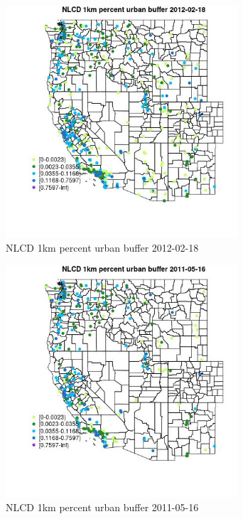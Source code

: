 \begin{figure} 
\centering  
\includegraphics[width=0.77\textwidth]{Code_Outputs/Report_ML_input_PM25_Step4_part_f_de_duplicated_aveswNAs_MapObsNLCD_1km_percent_urban_buffer2012-02-18.jpg} 
\caption{\label{fig:Report_ML_input_PM25_Step4_part_f_de_duplicated_aveswNAsMapObsNLCD_1km_percent_urban_buffer2012-02-18}NLCD 1km percent urban buffer 2012-02-18} 
\end{figure} 
 

\begin{figure} 
\centering  
\includegraphics[width=0.77\textwidth]{Code_Outputs/Report_ML_input_PM25_Step4_part_f_de_duplicated_aveswNAs_MapObsNLCD_1km_percent_urban_buffer2011-05-16.jpg} 
\caption{\label{fig:Report_ML_input_PM25_Step4_part_f_de_duplicated_aveswNAsMapObsNLCD_1km_percent_urban_buffer2011-05-16}NLCD 1km percent urban buffer 2011-05-16} 
\end{figure} 
 

